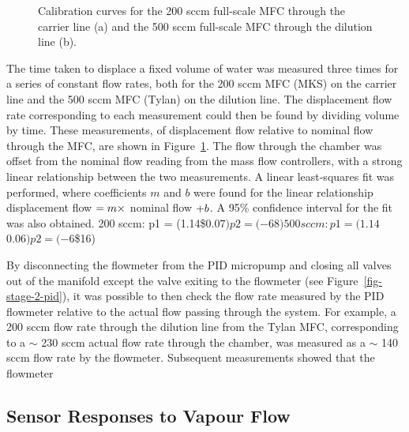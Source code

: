 \documentclass[
  a4paper,
]{scrbook}
\begin{document}
\begin{figure}
\begin{minipage}[t]{0.47\linewidth}
{{}

}

\subcaption{\label{fig-500-MFC-curve}}
\end{minipage}%

\caption{\label{fig-MFC-calibration-curves}Calibration curves for the
200 sccm full-scale MFC through the carrier line (a) and the 500 sccm
full-scale MFC through the dilution line (b).}

\end{figure}

The time taken to displace a fixed volume of water was measured three
times for a series of constant flow rates, both for the 200 sccm MFC
(MKS) on the carrier line and the 500 sccm MFC (Tylan) on the dilution
line. The displacement flow rate corresponding to each measurement could
then be found by dividing volume by time. These measurements, of
displacement flow relative to nominal flow through the MFC, are shown in
Figure~\ref{fig-MFC-calibration-curves}. The flow through the chamber
was offset from the nominal flow reading from the mass flow controllers,
with a strong linear relationship between the two measurements. A linear
least-squares fit was performed, where coefficients \(m\) and \(b\) were
found for the linear relationship displacement flow
\(= \space m \space \times\) nominal flow \(+ \space b\). A 95\%
confidence interval for the fit was also obtained. 200 sccm: p1 =
(1.14\$\pm\(0.07) p2 = (-6\)\pm\(8) 500 sccm: p1 = (1.14\)\pm\(0.06) p2 = (-6\)\pm\$16)

By disconnecting the flowmeter from the PID micropump and closing all
valves out of the manifold except the valve exiting to the flowmeter
(see Figure~\ref{fig-stage-2-pid}), it was possible to then check the
flow rate measured by the PID flowmeter relative to the actual flow
passing through the system. For example, a 200 sccm flow rate through
the dilution line from the Tylan MFC, corresponding to a \(\sim\) 230
sccm actual flow rate through the chamber, was measured as a \(\sim\)
140 sccm flow rate by the flowmeter. Subsequent measurements showed that
the flowmeter

\hypertarget{sensor-responses-to-vapour-flow}{%
\subsection{Sensor Responses to Vapour
Flow}\label{sensor-responses-to-vapour-flow}}
\end{document}
